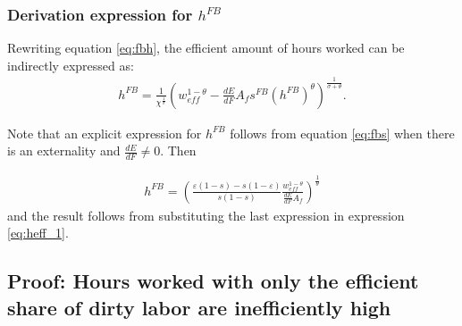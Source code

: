 \subsubsection{Derivation expression for $h^{FB}$}
Rewriting equation \ref{eq:fbh}, the efficient amount of hours worked can be indirectly expressed as:
\begin{align}
h^{FB}=\frac{1}{\chi^\frac{1}{\sigma}}\left(w_{eff}^{1-\theta}-\frac{dE}{dF}A_f s^{FB}\left(h^{FB}\right)^\theta \right)^\frac{1}{\sigma+\theta}.\label{eq:heff_1}
\end{align}

Note that an explicit expression for $h^{FB}$ follows from equation \ref{eq:fbs} when there is an externality and $\frac{dE}{dF}\neq 0$. Then 

\begin{align}
h^{FB}= \left(\frac{\varepsilon(1-s)-s(1-\varepsilon)}{s(1-s)}\frac{w_{eff}^{1-\theta}}{\frac{dE}{dF}A_f }\right)^\frac{1}{\theta}
\end{align}
and the result follows from substituting the last expression in expression  \ref{eq:heff_1}.

\subsection{Proof: Hours worked with only the efficient share of dirty labor are inefficiently high}

